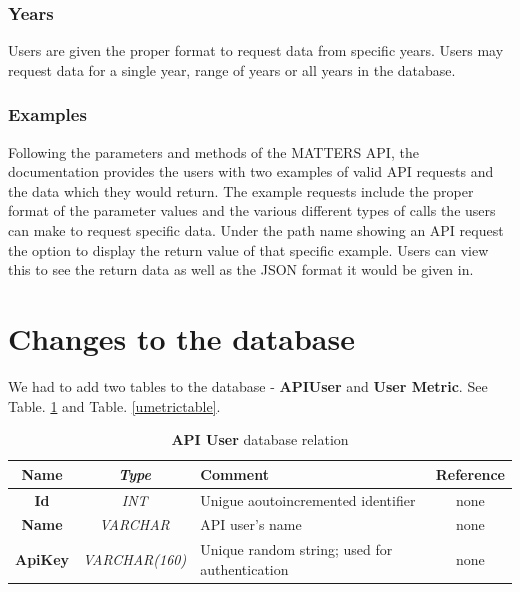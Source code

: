 		\subsubsection{Years}
			
			Users are given the proper format to request data from specific years. Users may request data for a single year, range of years or all years in the database. 
			
		\subsubsection{Examples}
			
			Following the parameters and methods of the MATTERS API, the documentation provides the users with two examples of valid API requests and the data which they would return. The example requests include the proper format of the parameter values and the various different types of calls the users can make to request specific data. Under the path name showing an API request the option to display the return value of that specific example. Users can view this to see the return data as well as the JSON format it would be given in. 
			


\section{Changes to the database}

	We had to add two tables to the database - \textbf{APIUser} and \textbf{User Metric}. See Table. \ref{apiusertable} and Table. \ref{umetrictable}.
	
	\begin{table}[t!]
		\centering
		\begin{tabular}{| >{\bf}c | >{\em}c | l | c |} 
			\hline
			Name	& Type			& Comment										& Reference	\\ \hline
			Id		& INT			& Unigue aoutoincremented identifier			& none		\\
			Name	& VARCHAR		& API user's name								& none		\\
			ApiKey	& VARCHAR(160)	& Unique random string; used for authentication	& none		\\
			\hline
		\end{tabular}
		\caption{\textbf{API User} database relation}
		\label{apiusertable}
	\end{table}
	

